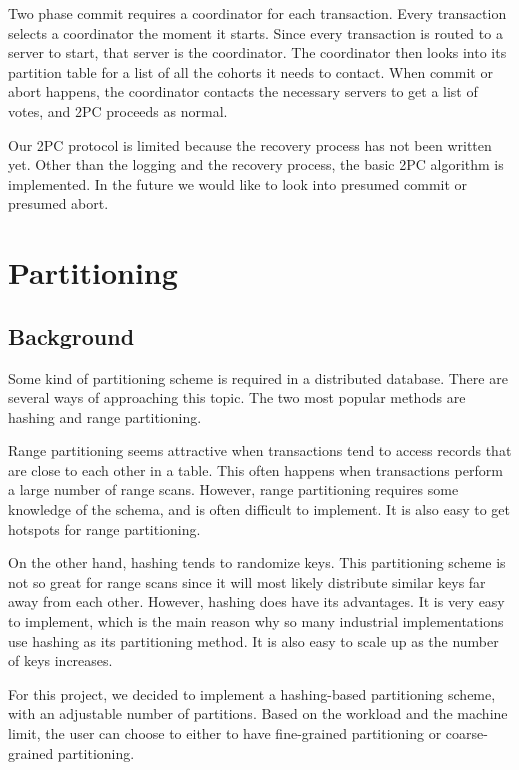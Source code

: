 \documentclass[a4paper, 10pt, notitlepage]{article}
\begin{document}
Two phase commit requires a coordinator for each transaction. Every transaction selects a coordinator the moment
it starts. Since every transaction is routed to a server to start, that server is the coordinator. The coordinator then looks
into its partition table for a list of all the cohorts it needs to contact. When commit or abort happens, the coordinator
contacts the necessary servers to get a list of votes, and 2PC proceeds as normal.

Our 2PC protocol is limited because the recovery process has not been written yet. Other than the logging and the recovery
process, the basic 2PC algorithm is implemented. In the future we would like to look into presumed commit or presumed abort.

\section{Partitioning}

\subsection{Background}

Some kind of partitioning scheme is required in a distributed database. There are several ways of approaching
this topic. The two most popular methods are hashing and range partitioning.

Range partitioning seems attractive when transactions tend to access records that are close to each other
in a table. This often happens when transactions perform a large number of range scans. However, range partitioning
requires some knowledge of the schema, and is often difficult to implement. It is also easy to get hotspots for
range partitioning.

On the other hand, hashing tends to randomize keys. This partitioning scheme is not so great for range scans
since it will most likely distribute similar keys far away from each other. However, hashing does have its advantages.
It is very easy to implement, which is the main reason why so many industrial implementations use hashing as its
partitioning method. It is also easy to scale up as the number of keys increases. 

For this project, we decided to implement a hashing-based partitioning scheme, with an adjustable number of partitions.
Based on the workload and the machine limit, the user can choose to either to have fine-grained partitioning or
coarse-grained partitioning.
\end{document}
